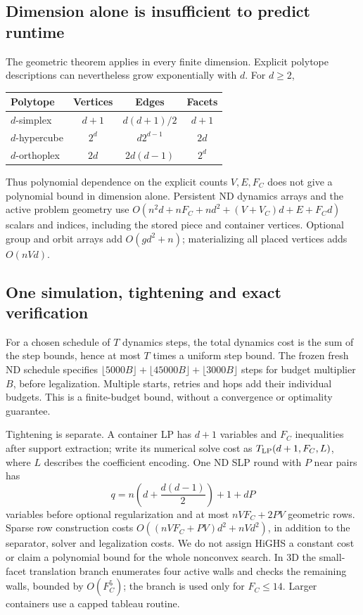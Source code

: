 \documentclass[11pt,a4paper]{article}
\begin{document}
\subsection{Dimension alone is insufficient to predict runtime}
The geometric theorem applies in every finite dimension. Explicit polytope descriptions can nevertheless grow exponentially with $d$. For $d\geq2$,
\begin{center}\small
\begin{tabular}{lccc}
\toprule
Polytope & Vertices & Edges & Facets\\
\midrule
$d$-simplex & $d+1$ & $d(d+1)/2$ & $d+1$\\
$d$-hypercube & $2^d$ & $d2^{d-1}$ & $2d$\\
$d$-orthoplex & $2d$ & $2d(d-1)$ & $2^d$\\
\bottomrule
\end{tabular}
\end{center}
Thus polynomial dependence on the explicit counts $V,E,F_C$ does not give a polynomial bound in dimension alone. Persistent ND dynamics arrays and the active problem geometry use
$O(n^2d+nF_C+nd^2+(V+V_C)d+E+F_Cd)$ scalars and indices, including the stored piece and container vertices. Optional group and orbit arrays add $O(gd^2+n)$; materializing all placed vertices adds $O(nVd)$.

\subsection{One simulation, tightening and exact verification}
For a chosen schedule of $T$ dynamics steps, the total dynamics cost is the sum of the step bounds, hence at most $T$ times a uniform step bound. The frozen fresh ND schedule specifies $\lfloor5000B\rfloor+\lfloor45000B\rfloor+\lfloor3000B\rfloor$ steps for budget multiplier $B$, before legalization. Multiple starts, retries and hops add their individual budgets. This is a finite-budget bound, without a convergence or optimality guarantee.

Tightening is separate. A container LP has $d+1$ variables and $F_C$ inequalities after support extraction; write its numerical solve cost as $T_{\rm LP}(d+1,F_C,L)$, where $L$ describes the coefficient encoding. One ND SLP round with $P$ near pairs has
\[
q=n\left(d+\frac{d(d-1)}2\right)+1+dP
\]
variables before optional regularization and at most $nVF_C+2PV$ geometric rows. Sparse row construction costs $O((nVF_C+PV)d^2+nVd^2)$, in addition to the separator, solver and legalization costs. We do not assign HiGHS a constant cost or claim a polynomial bound for the whole nonconvex search. In 3D the small-facet translation branch enumerates four active walls and checks the remaining walls, bounded by $O(F_C^5)$; the branch is used only for $F_C\leq14$. Larger containers use a capped tableau routine.
\end{document}

